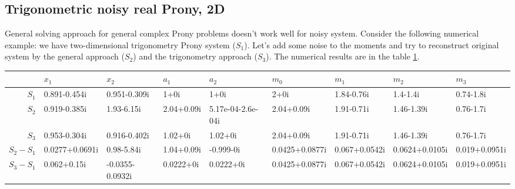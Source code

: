 \subsection{Trigonometric noisy real Prony, 2D}

General solving approach for general complex Prony problems doesn't work well for noisy system. Consider the following numerical example: we have two-dimensional trigonometry Prony system ($S_1$). Let's add some noise to the moments and try to reconstruct original system by the general approach ($S_2$) and the trigonometry approach ($S_3$).
The numerical results are in the table \ref{tbl:noisy}.

\begin{table}
\label{tbl:noisy}
\centering
\begin{tabular}{rllllllll}
  \hline
 & $x_1$ & $x_2$ & $a_1$ & $a_2$ & $m_0$ & $m_1$ & $m_2$ & $m_3$ \\ 
  \hline
  $S_1$ & 0.891-0.454i & 0.951-0.309i & 1+0i & 1+0i & 2+0i & 1.84-0.76i & 1.4-1.4i & 0.74-1.8i \\ 
  $S_2$ & 0.919-0.385i & 1.93-6.15i & 2.04+0.09i & 5.17e-04-2.6e-04i & 2.04+0.09i & 1.91-0.71i & 1.46-1.39i & 0.76-1.7i \\ 
  $S_3$ & 0.953-0.304i & 0.916-0.402i & 1.02+0i & 1.02+0i & 2.04+0.09i & 1.91-0.71i & 1.46-1.39i & 0.76-1.7i \\ 
  $S_2-S_1$ & 0.0277+0.0691i & 0.98-5.84i & 1.04+0.09i & -0.999-0i & 0.0425+0.0877i & 0.067+0.0542i & 0.0624+0.0105i & 0.019+0.0951i \\ 
  $S_3-S_1$ & 0.062+0.15i & -0.0355-0.0932i & 0.0222+0i & 0.0222+0i & 0.0425+0.0877i & 0.067+0.0542i & 0.0624+0.0105i & 0.019+0.0951i \\ 
   \hline
\end{tabular}
\end{table}
  
